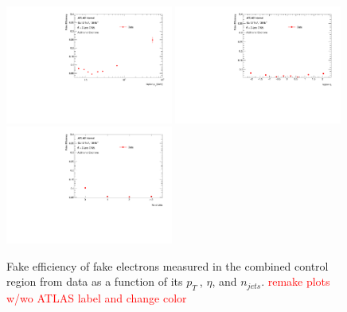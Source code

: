 \begin{figure}[htb]
        \begin{center}
        \includegraphics[width = 0.49\textwidth]{figures/Analysis/Background/Fake_Eff_Elec_pt_1D.pdf}
        \includegraphics[width = 0.49\textwidth]{figures/Analysis/Background/Fake_Eff_Elec_eta_1D.pdf}\\
        \includegraphics[width = 0.49\textwidth]{figures/Analysis/Background/Fake_Eff_Elec_jet_n_1D.pdf} 
        \end{center}
    \caption{Fake efficiency of fake electrons measured in the combined control region from data as a function of its $p_{T}~$, $\eta$, and $n_{jets}$. \textcolor{red}{remake plots w/wo ATLAS label and change color} \label{fig:FakeEff_1D_Electron}}
\end{figure}


